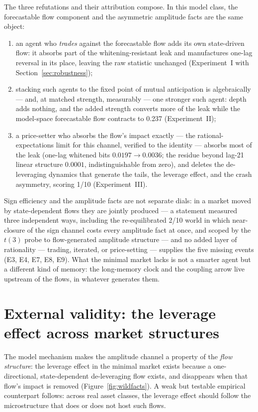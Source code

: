\documentclass[11pt]{article}
\begin{document}
The three refutations and their attribution compose. In this model
class, the forecastable flow component and the asymmetric amplitude
facts are the same object:
%
\begin{enumerate}
\item an agent who \emph{trades} against the forecastable flow adds its own
  state-driven flow: it absorbs part of the whitening-resistant leak and
  manufactures
  one-lag reversal in its place, leaving the raw statistic unchanged
  (Experiment~I with Section~\ref{sec:robustness});
\item stacking such agents to the fixed point of mutual anticipation is
  algebraically --- and, at matched strength, measurably --- one stronger
  such agent: depth adds nothing, and the added strength converts more of
  the leak while the model-space forecastable flow contracts to 0.237
  (Experiment~II);
\item a price-setter who absorbs the flow's impact exactly --- the
  rational-expectations limit for this channel, verified to the identity ---
  absorbs most of the leak (one-lag whitened bits
  $0.0197 \to 0.0036$; the residue beyond lag-21 linear structure
  $0.0001$, indistinguishable from zero), and deletes the de-leveraging
  dynamics that generate
  the tails, the leverage effect, and the crash asymmetry, scoring 1/10
  (Experiment~III).
\end{enumerate}
%
Sign efficiency and the amplitude facts are not separate dials: in a market
moved by state-dependent flows they are jointly produced --- a statement
measured three independent ways, including the re-equilibrated 2/10 world
in which near-closure of the sign channel costs every amplitude fact at
once, and scoped by the $t(3)$ probe to flow-generated amplitude
structure --- and no added layer of
rationality --- trading, iterated, or price-setting --- supplies the five missing
events (E3, E4, E7, E8, E9). What the minimal market lacks is not a smarter
agent but a different kind of memory: the long-memory clock and the coupling
arrow live upstream of the flows, in whatever generates them.

\section{External validity: the leverage effect across market structures}
\label{sec:triangle}

The model mechanism makes the amplitude channel a property of the \emph{flow
structure}: the leverage effect in the minimal market exists because a
one-directional, state-dependent de-leveraging flow exists, and disappears
when that
flow's impact is removed (Figure~\ref{fig:wildfacts}). A weak but testable
empirical counterpart follows: across real asset classes, the leverage effect
should
follow the microstructure that does or does not host such flows.
\end{document}
